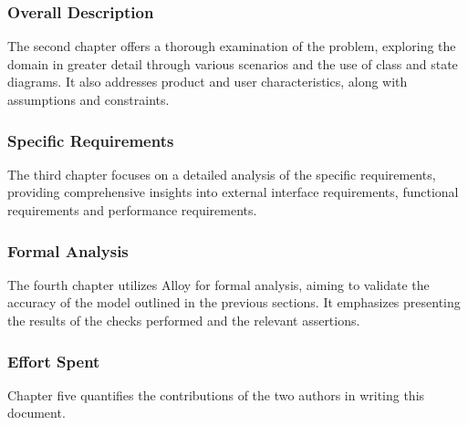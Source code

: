 \subsubsection{Overall Description}
The second chapter offers a thorough examination of the problem, exploring the domain in greater detail through various scenarios and the use of class and state diagrams.
It also addresses product and user characteristics, along with assumptions and constraints.

\subsubsection{Specific Requirements}
The third chapter focuses on a detailed analysis of the specific requirements, providing comprehensive insights into external interface requirements, functional requirements and performance requirements.

\subsubsection{Formal Analysis}
The fourth chapter utilizes Alloy for formal analysis, aiming to validate the accuracy of the model outlined in the previous sections.
It emphasizes presenting the results of the checks performed and the relevant assertions.

\subsubsection{Effort Spent}
Chapter five quantifies the contributions of the two authors in writing this document.
